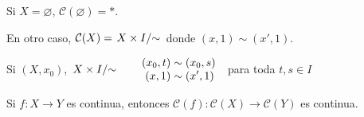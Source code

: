 \begin{tcolorbox}[colback=white!15!white,colframe=red!75!black,title=\textbf{Cono}\index{cono}]
        Si \(X=\varnothing\), \(\mathcal{C}(\varnothing)=\ast\).

        En otro caso, \(\mathcal{C}(X)=\left.X\times I\middle/\sim\right.\) donde \((x, 1)\sim(x', 1)\).
\end{tcolorbox}


\begin{tcolorbox}[colback=white!15!white,colframe=red!75!black,title=\textbf{Cono reducido}\index{cono reducido}]
    Si \((X, x_0)\), \(\left.X\times I\middle/\sim\right.
    \qquad 
    \begin{aligned}
        (x_0, t)&\sim(x_0, s)\\[-3pt]
        (x, 1)&\sim(x', 1)\\
    \end{aligned}\)
    \,\, para toda \(t, s\in I\)
\end{tcolorbox}

\begin{tcolorbox}[colback=blue!5!white,colframe=blue!75!blue,title=\textbf{Proposición}.]
    Si \(f\colon X\to Y\) es continua, entonces \(\mathcal{C}(f)\colon \mathcal{C}(X)\to\mathcal{C}(Y)\) es continua.
\end{tcolorbox}


